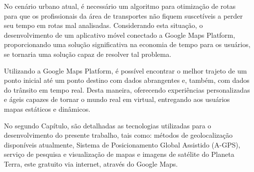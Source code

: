 
No cenário urbano atual, é necessário um algoritmo para otimização de rotas para que os profissionais da área de transportes não fiquem suscetíveis a perder seu tempo em rotas mal analisadas. Considerando esta situação, o desenvolvimento de um aplicativo móvel conectado a Google Maps Platform, proporcionando uma solução significativa na economia de tempo para os usuários, se tornaria uma solução capaz de resolver tal problema.


Utilizando a Google Maps Platform, é possível encontrar o melhor trajeto de um ponto inicial até um ponto destino com dados abrangentes e, também, com dados do trânsito em tempo real. Desta maneira, oferecendo experiências personalizadas e ágeis capazes de tornar o mundo real em virtual, entregando aos usuários mapas estáticos e dinâmicos. 


No segundo Capítulo, são detalhadas as tecnologias utilizadas para o desenvolvimento do presente trabalho, tais como: métodos de geolocalização disponíveis atualmente, Sistema de Posicionamento Global Assistido (A-GPS), serviço de pesquisa e visualização de mapas e imagens de satélite do Planeta Terra, este gratuito via internet, através do Google Maps.

